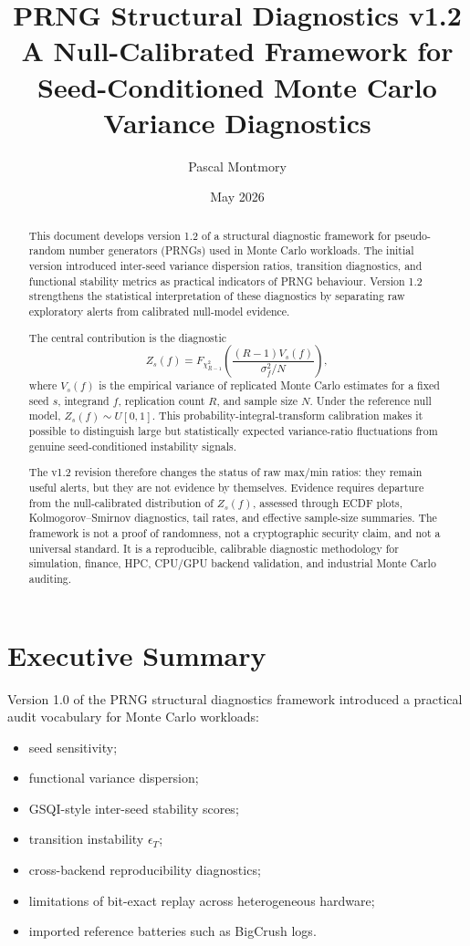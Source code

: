 \documentclass[11pt,a4paper]{article}
\title{
  PRNG Structural Diagnostics v1.2\\
  \large A Null-Calibrated Framework for Seed-Conditioned Monte Carlo Variance Diagnostics
}
\author{Pascal Montmory}
\date{May 2026}
\begin{document}
\maketitle

\begin{abstract}
This document develops version 1.2 of a structural diagnostic framework for pseudo-random number generators (PRNGs) used in Monte Carlo workloads. The initial version introduced inter-seed variance dispersion ratios, transition diagnostics, and functional stability metrics as practical indicators of PRNG behaviour. Version 1.2 strengthens the statistical interpretation of these diagnostics by separating raw exploratory alerts from calibrated null-model evidence.

The central contribution is the diagnostic
\[
Z_s(f)
=
F_{\chi^2_{R-1}}
\left(
\frac{(R-1)V_s(f)}{\sigma_f^2/N}
\right),
\]
where \(V_s(f)\) is the empirical variance of replicated Monte Carlo estimates for a fixed seed \(s\), integrand \(f\), replication count \(R\), and sample size \(N\). Under the reference null model, \(Z_s(f)\sim U[0,1]\). This probability-integral-transform calibration makes it possible to distinguish large but statistically expected variance-ratio fluctuations from genuine seed-conditioned instability signals.

The v1.2 revision therefore changes the status of raw max/min ratios: they remain useful alerts, but they are not evidence by themselves. Evidence requires departure from the null-calibrated distribution of \(Z_s(f)\), assessed through ECDF plots, Kolmogorov--Smirnov diagnostics, tail rates, and effective sample-size summaries. The framework is not a proof of randomness, not a cryptographic security claim, and not a universal standard. It is a reproducible, calibrable diagnostic methodology for simulation, finance, HPC, CPU/GPU backend validation, and industrial Monte Carlo auditing.
\end{abstract}

\tableofcontents
\newpage

\section{Executive Summary}

Version 1.0 of the PRNG structural diagnostics framework introduced a practical audit vocabulary for Monte Carlo workloads:
\begin{itemize}
  \item seed sensitivity;
  \item functional variance dispersion;
  \item GSQI-style inter-seed stability scores;
  \item transition instability \(\epsilon_T\);
  \item cross-backend reproducibility diagnostics;
  \item limitations of bit-exact replay across heterogeneous hardware;
  \item imported reference batteries such as BigCrush logs.
\end{itemize}
\end{document}
